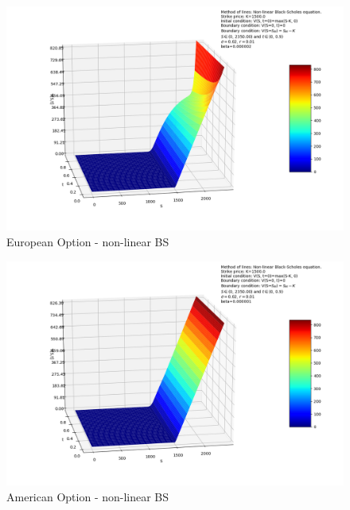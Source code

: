 \documentclass[10pt,a4paper]{article}
\begin{document}
	\begin{figure}[H]
		\centering
		\includegraphics[width = 1.0\linewidth]{Black-Scholes_K1500.0_sigma0.02_r0.01_beta2e-06_T0.9_nonlinear_european.png}
		\caption[European Option - non-linear BS]{European Option - non-linear BS}
		\label{fig:E}
	\end{figure}

	\begin{figure}[H]
	\centering
	\includegraphics[width = 1.0\linewidth]{Black-Scholes_K1500.0_sigma0.02_r0.01_beta1e-06_T0.9_nonlinear_american.png}
	\caption[American Option - non-linear BS]{American Option - non-linear BS}
	\label{fig:A}
   \end{figure}
\end{document}
